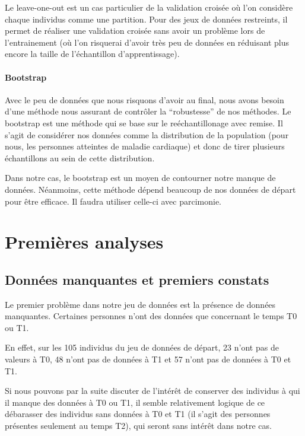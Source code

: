 \documentclass[]{article}
\let\oldparagraph\paragraph
\renewcommand{\paragraph}[1]{\oldparagraph{#1}\mbox{}}
\begin{document}
Le leave-one-out est un cas particulier de la validation croisée où l'on
considère chaque individus comme une partition. Pour des jeux de données
restreints, il permet de réaliser une validation croisée sans avoir un
problème lors de l'entrainement (où l'on risquerai d'avoir très peu de
données en réduisant plus encore la taille de l'échantillon
d'apprentissage).

\hypertarget{bootstrap}{%
\paragraph{Bootstrap}\label{bootstrap}}

Avec le peu de données que nous risquons d'avoir au final, nous avons
besoin d'une méthode nous assurant de contrôler la ``robustesse'' de nos
méthodes. Le bootstrap est une méthode qui se base sur le
reéchantillonage avec remise. Il s'agit de considérer nos données comme
la distribution de la population (pour nous, les personnes atteintes de
maladie cardiaque) et donc de tirer plusieurs échantillons au sein de
cette distribution.

Dans notre cas, le bootstrap est un moyen de contourner notre manque de
données. Néanmoins, cette méthode dépend beaucoup de nos données de
départ pour être efficace. Il faudra utiliser celle-ci avec parcimonie.

\newpage

\hypertarget{premiuxe8res-analyses}{%
\section{Premières analyses}\label{premiuxe8res-analyses}}

\hypertarget{donnuxe9es-manquantes-et-premiers-constats}{%
\subsection{Données manquantes et premiers
constats}\label{donnuxe9es-manquantes-et-premiers-constats}}

Le premier problème dans notre jeu de données est la présence de données
manquantes. Certaines personnes n'ont des données que concernant le
temps T0 ou T1.

En effet, sur les 105 individus du jeu de données de départ, 23 n'ont
pas de valeurs à T0, 48 n'ont pas de données à T1 et 57 n'ont pas de
données à T0 et T1.

Si nous pouvons par la suite discuter de l'intérêt de conserver des
individus à qui il manque des données à T0 ou T1, il semble relativement
logique de ce débarasser des individus sans données à T0 et T1 (il
s'agit des personnes présentes seulement au temps T2), qui seront sans
intérêt dans notre cas.
\end{document}
